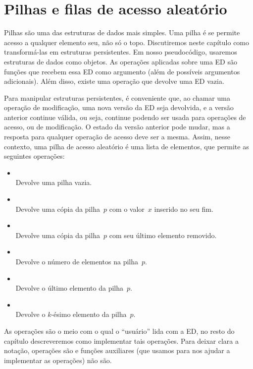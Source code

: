 \documentclass[main.tex]{subfiles}
\begin{document}
\chapter{Pilhas e filas de acesso aleatório} \label{cap:pilha_persist}
Pilhas são uma das estruturas de dados mais simples. Uma pilha é  se permite acesso a qualquer elemento seu, não só o topo. Discutiremos neste capítulo como transformá-las em estruturas persistentes. Em nosso pseudocódigo, usaremos estruturas de dados como objetos. As operações aplicadas sobre uma ED são funções que recebem essa ED como argumento (além de possíveis argumentos adicionais). Além disso, existe uma operação que devolve uma ED vazia.

Para manipular estruturas persistentes, é conveniente que, ao chamar uma operação de modificação, uma nova versão da ED seja devolvida, e a versão anterior continue válida, ou seja, continue podendo ser usada para operações de acesso, ou de modificação. O estado da versão anterior pode mudar, mas a resposta para qualquer operação de acesso deve ser a mesma. Assim, nesse contexto, uma pilha de acesso aleatório é uma lista de elementos, que permite as seguintes operações:

\begin{itemize}
	\item {}
		\\ Devolve uma pilha vazia.
	\item {}
		\\ Devolve uma cópia da pilha~$p$ com o valor~$x$ inserido no seu fim.
	\item {}
		\\ Devolve uma cópia da pilha~$p$ com seu último elemento removido.
	\item {}
		\\ Devolve o número de elementos na pilha~$p$.
	\item {}
		\\ Devolve o último elemento da pilha~$p$.
	\item {}
		\\ Devolve o $k$-ésimo elemento da pilha~$p$.
\end{itemize}

As operações são o meio com o qual o ``usuário'' lida com a ED, no resto do capítulo descreveremos como implementar tais operações. Para deixar clara a notação, operações são  e funções auxiliares (que usamos para nos ajudar a implementar as operações) não são.
\end{document}
